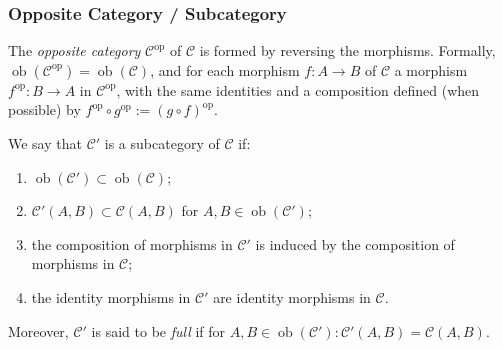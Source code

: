 \documentclass[UTF8,aspectratio=43,11pt,colorlinks,compress,openany]{beamer}%
\begin{document}
\begin{frame}\frametitle{Opposite Category / Subcategory}
\begin{definition}
The \emph{opposite category} $\mathcal{C}^\mathrm{op}$ of $\mathcal{C}$ is formed by reversing the morphisms. Formally, $\operatorname{ob}(\mathcal{C}^\mathrm{op})=
\operatorname{ob}(\mathcal{C})$, and for each morphism $f: A\to B$ of $\mathcal{C}$ a morphism $f^\mathrm{op}: B\to A$ in $\mathcal{C}^\mathrm{op}$, with the same identities and a composition defined (when possible) by $f^\mathrm{op}\circ g^\mathrm{op}:=(g\circ f)^\mathrm{op}$.
\end{definition}
\begin{definition}[Subcategory]
	We say that $\mathcal{C}'$ is a subcategory of $\mathcal{C}$ if:
	\begin{enumerate}
		\item $\operatorname{ob}(\mathcal{C}')\subset\operatorname{ob}(\mathcal{C})$;
		\item $\mathcal{C}'(A,B)\subset\mathcal{C}(A,B)$ for $A,B\in\operatorname{ob}(\mathcal{C}')$;
		\item the composition of morphisms in $\mathcal{C}'$ is induced by the composition of morphisms in $\mathcal{C}$;
		\item the identity morphisms in $\mathcal{C}'$ are identity morphisms in $\mathcal{C}$.
	\end{enumerate}
\end{definition}
Moreover, $\mathcal{C}'$ is said to be \emph{full} if for $A,B\in\operatorname{ob}(\mathcal{C}'):\mathcal{C}'(A,B)=\mathcal{C}(A,B)$.
\end{frame}
\end{document}
